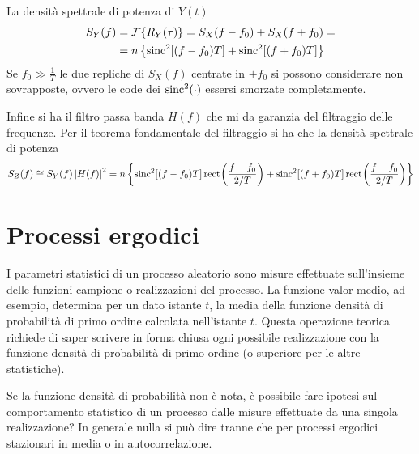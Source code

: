 La densità spettrale di potenza di $Y(t)$
\[
	\begin{split}
		S_Y(f)&=\operatorname{\mathcal{F}}\!\left\lbrace{R_Y(\tau)}\right\rbrace=S_X(f-f_0)+S_X(f+f_0)=\\
		&=n\left\lbrace\operatorname{sinc}^2[(f-f_0)T]+\operatorname{sinc}^2[(f+f_0)T]\right\rbrace
	\end{split}
\]
Se $f_0\gg\frac{1}{T}$ le due repliche di $S_X(f)$ centrate in $\pm f_0$ si possono considerare non sovrapposte, ovvero le code dei $\operatorname{sinc}^2(\cdot)$ essersi smorzate completamente.

Infine si ha il filtro passa banda $H(f)$ che mi da garanzia del filtraggio delle frequenze. Per il teorema fondamentale del filtraggio si ha che la densità spettrale di potenza
\[
	S_Z(f)\cong S_Y(f)\left|{H(f)}\right|^2=n\left\lbrace\operatorname{sinc}^2[(f-f_0)T]\,{\operatorname{rect}}^{}\!\left({\frac{f-f_0}{2/T}}\right)+\operatorname{sinc}^2[(f+f_0)T]\,{\operatorname{rect}}^{}\!\left({\frac{f+f_0}{2/T}}\right)\right\rbrace
\]

\begin{figure}[!ht]
	\centering
\end{figure}

\section{Processi ergodici}
I parametri statistici di un processo aleatorio sono misure effettuate sull'insieme delle funzioni campione o realizzazioni del processo. La funzione valor medio, ad esempio, determina per un dato istante $t$, la media della funzione densità di probabilità di primo ordine calcolata nell'istante $t$. Questa operazione teorica richiede di saper scrivere in forma chiusa ogni possibile realizzazione con la funzione densità di probabilità di primo ordine (o superiore per le altre statistiche).

Se la funzione densità di probabilità non è nota, è possibile fare ipotesi sul comportamento statistico di un processo dalle misure effettuate da una singola realizzazione?
In generale nulla si può dire tranne che per processi ergodici stazionari in media o in autocorrelazione.

